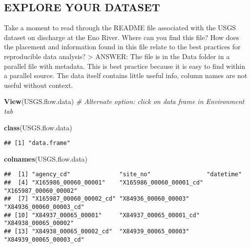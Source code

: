 \documentclass[]{article}
\newenvironment{Shaded}{\begin{snugshade}}{\end{snugshade}}
\newcommand{\CommentTok}[1]{\textcolor[rgb]{0.56,0.35,0.01}{\textit{#1}}}
\newcommand{\KeywordTok}[1]{\textcolor[rgb]{0.13,0.29,0.53}{\textbf{#1}}}
\newcommand{\NormalTok}[1]{#1}
\begin{document}
\hypertarget{explore-your-dataset}{%
\subsection{EXPLORE YOUR DATASET}\label{explore-your-dataset}}

Take a moment to read through the README file associated with the USGS
dataset on discharge at the Eno River. Where can you find this file? How
does the placement and information found in this file relate to the best
practices for reproducible data analysis? \textgreater{} ANSWER: The
file is in the Data folder in a parallel file with metadata. This is
best practice because it is easy to find within a parallel source. The
data itself contains little useful info, column names are not useful
without context.

\begin{Shaded}
\begin{Highlighting}[]
\KeywordTok{View}\NormalTok{(USGS.flow.data)}
\CommentTok{# Alternate option: click on data frame in Environment tab}

\KeywordTok{class}\NormalTok{(USGS.flow.data)}
\end{Highlighting}
\end{Shaded}

\begin{verbatim}
## [1] "data.frame"
\end{verbatim}

\begin{Shaded}
\begin{Highlighting}[]
\KeywordTok{colnames}\NormalTok{(USGS.flow.data)}
\end{Highlighting}
\end{Shaded}

\begin{verbatim}
##  [1] "agency_cd"              "site_no"                "datetime"              
##  [4] "X165986_00060_00001"    "X165986_00060_00001_cd" "X165987_00060_00002"   
##  [7] "X165987_00060_00002_cd" "X84936_00060_00003"     "X84936_00060_00003_cd" 
## [10] "X84937_00065_00001"     "X84937_00065_00001_cd"  "X84938_00065_00002"    
## [13] "X84938_00065_00002_cd"  "X84939_00065_00003"     "X84939_00065_00003_cd"
\end{verbatim}
\end{document}
